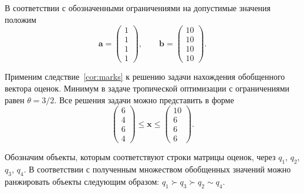 \documentclass[specialist,
               substylefile = spbu.rtx,
               subf,href,colorlinks=true, 12pt]{disser}
\theoremstyle{definition}
\begin{document}
В соответствии с обозначенными ограничениями на допустимые значения положим
\begin{equation*}
\bm{a}
=
\begin{pmatrix}
1\\1\\1\\1
\end{pmatrix},
\qquad
\bm{b}
=
\begin{pmatrix}
10\\10\\10\\10
\end{pmatrix}.
\end{equation*}

Применим следствие~\ref{cor:marks} к решению задачи нахождения обобщенного вектора оценок.
Минимум в задаче тропической оптимизации с ограничениями равен $\theta=3/2$.
 Все решения задачи можно представить в форме
\begin{equation*}
\begin{pmatrix}
6\\4\\6\\4
\end{pmatrix}
\leq
\bm{x}
\leq
\begin{pmatrix}
10\\6\\6\\6
\end{pmatrix}.
\end{equation*}

Обозначим объекты, которым соответствуют строки матрицы оценок, через $q_{1}$, $q_{2}$, $q_{3}$, $q_{4}$. 
В соответствии с полученным множеством обобщенных значений можно ранжировать объекты следующим образом: $q_{1}\succ q_{3}\succ q_{2}\sim q_{4}$.
\end{document}

